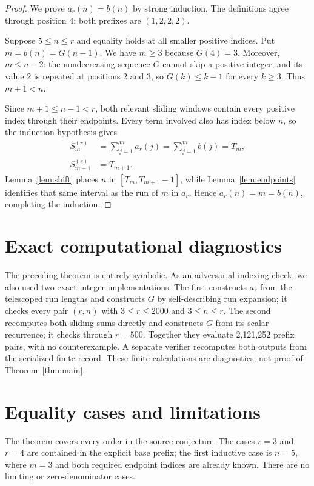 \documentclass[11pt]{amsart}
\theoremstyle{definition}
\begin{document}
\begin{proof}
We prove $a_r(n)=b(n)$ by strong induction.  The definitions agree through
position $4$: both prefixes are $(1,2,2,2)$.

Suppose $5\leq n\leq r$ and equality holds at all smaller positive indices.
Put $m=b(n)=G(n-1)$.  We have $m\geq3$ because $G(4)=3$.  Moreover,
$m\leq n-2$: the nondecreasing sequence $G$ cannot skip a positive integer,
and its value $2$ is repeated at positions $2$ and $3$, so
$G(k)\leq k-1$ for every $k\geq3$.  Thus $m+1<n$.

Since $m+1\leq n-1<r$, both relevant sliding windows contain every positive
index through their endpoints.  Every term involved also has index below
$n$, so the induction hypothesis gives
\begin{align*}
 S_m^{(r)}&=\sum_{j=1}^{m}a_r(j)
            =\sum_{j=1}^{m}b(j)=T_m,\\
 S_{m+1}^{(r)}&=T_{m+1}.
\end{align*}
Lemma~\ref{lem:shift} places $n$ in $[T_m,T_{m+1}-1]$, while
Lemma~\ref{lem:endpoints} identifies that same interval as the run of $m$ in
$a_r$.  Hence $a_r(n)=m=b(n)$, completing the induction.
\end{proof}

\section{Exact computational diagnostics}

The preceding theorem is entirely symbolic.  As an adversarial indexing
check, we also used two exact-integer implementations.  The first constructs
$a_r$ from the telescoped run lengths and constructs $G$ by self-describing
run expansion; it checks every pair $(r,n)$ with $3\leq r\leq2000$ and
$3\leq n\leq r$.  The second recomputes both sliding sums directly and
constructs $G$ from its scalar recurrence; it checks through $r=500$.
Together they evaluate 2,121,252 prefix pairs, with no counterexample.
A separate verifier recomputes both outputs from the serialized finite
record.  These finite calculations are diagnostics, not proof of
Theorem~\ref{thm:main}.

\section{Equality cases and limitations}

The theorem covers every order in the source conjecture.  The cases $r=3$
and $r=4$ are contained in the explicit base prefix; the first inductive case
is $n=5$, where $m=3$ and both required endpoint indices are already known.
There are no limiting or zero-denominator cases.
\end{document}
